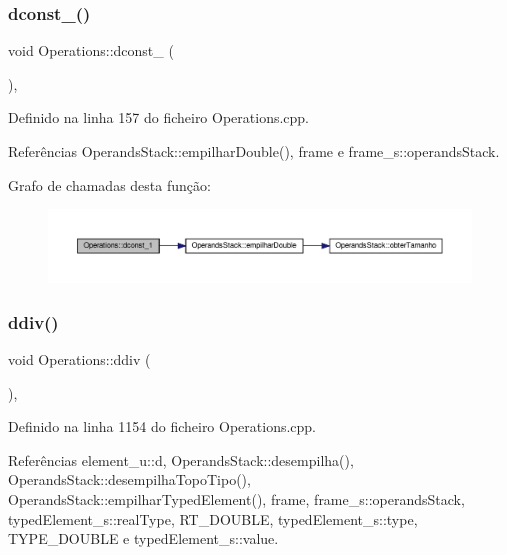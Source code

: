 \subsubsection{\texorpdfstring{dconst\+\_()}{dconst\_1()}}
{\footnotesize\ttfamily void Operations\+::dconst\+\_ (\begin{DoxyParamCaption}{ }\end{DoxyParamCaption})\hspace{0.3cm}{\ttfamily [static]}, {\ttfamily [private]}}



Definido na linha 157 do ficheiro Operations.\+cpp.



Referências Operands\+Stack\+::empilhar\+Double(), frame e frame\+\_\+s\+::operands\+Stack.

Grafo de chamadas desta função\+:\nopagebreak
\begin{figure}[H]
\begin{center}
\leavevmode
\includegraphics[width=350pt]{classOperations_a1a704891f81e3b532bf0eaad94429773_cgraph}
\end{center}
\end{figure}
\mbox{\label{classOperations_a3c323c9f0d40e68bf54cd449a55618c3}} 
\subsubsection{\texorpdfstring{ddiv()}{ddiv()}}
{\footnotesize\ttfamily void Operations\+::ddiv (\begin{DoxyParamCaption}{ }\end{DoxyParamCaption})\hspace{0.3cm}{\ttfamily [static]}, {\ttfamily [private]}}



Definido na linha 1154 do ficheiro Operations.\+cpp.



Referências element\+\_\+u\+::d, Operands\+Stack\+::desempilha(), Operands\+Stack\+::desempilha\+Topo\+Tipo(), Operands\+Stack\+::empilhar\+Typed\+Element(), frame, frame\+\_\+s\+::operands\+Stack, typed\+Element\+\_\+s\+::real\+Type, R\+T\+\_\+\+D\+O\+U\+B\+LE, typed\+Element\+\_\+s\+::type, T\+Y\+P\+E\+\_\+\+D\+O\+U\+B\+LE e typed\+Element\+\_\+s\+::value.

